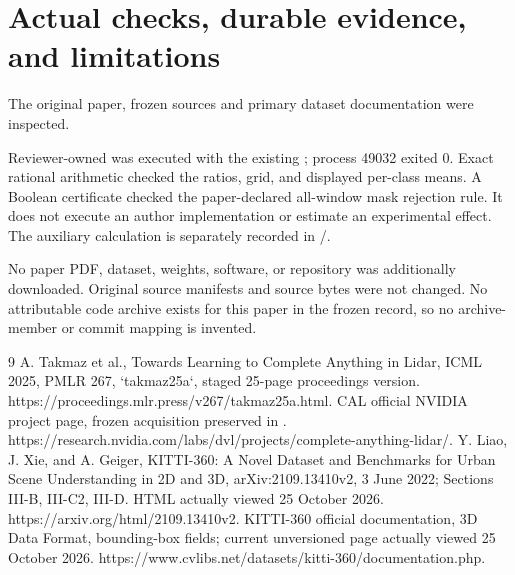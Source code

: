 \documentclass[10pt]{article}
\begin{document}
\section*{Actual checks, durable evidence, and limitations}
The original paper, frozen sources and primary dataset documentation were inspected.\par
Reviewer-owned was executed with the existing ; process 49032 exited 0. Exact rational arithmetic checked the ratios, grid, and displayed per-class means. A Boolean certificate checked the paper-declared all-window mask rejection rule. It does not execute an author implementation or estimate an experimental effect. The auxiliary calculation is separately recorded in /.\par
No paper PDF, dataset, weights, software, or repository was additionally downloaded. Original source manifests and source bytes were not changed. No attributable code archive exists for this paper in the frozen record, so no archive-member or commit mapping is invented.\par
9 A. Takmaz et al., Towards Learning to Complete Anything in Lidar, ICML 2025, PMLR 267, `takmaz25a`, staged 25-page proceedings version. https://proceedings.mlr.press/v267/takmaz25a.html. CAL official NVIDIA project page, frozen acquisition preserved in . https://research.nvidia.com/labs/dvl/projects/complete-anything-lidar/. Y. Liao, J. Xie, and A. Geiger, KITTI-360: A Novel Dataset and Benchmarks for Urban Scene Understanding in 2D and 3D, arXiv:2109.13410v2, 3 June 2022; Sections III-B, III-C2, III-D. HTML actually viewed 25 October 2026. https://arxiv.org/html/2109.13410v2. KITTI-360 official documentation, 3D Data Format, bounding-box fields; current unversioned page actually viewed 25 October 2026. https://www.cvlibs.net/datasets/kitti-360/documentation.php.\par
\end{document}
